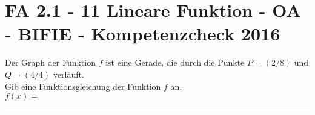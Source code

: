 \section{FA 2.1 - 11 Lineare Funktion - OA - BIFIE - Kompetenzcheck 2016}

\begin{beispiel}[FA 1.5]{1} %
				Der Graph der Funktion $f$ ist eine Gerade, die durch die Punkte $P=(2/8)$ und $Q=(4/4)$ verläuft.\\

Gib eine Funktionsgleichung der Funktion $f$ an.\\

$f(x)=$\rule{5cm}{0.3pt}\\

\end{beispiel}	